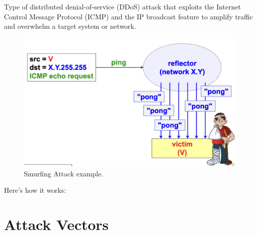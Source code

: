 \begin{multicols}{2}
    Type of distributed denial-of-service (DDoS) attack that exploits the Internet Control Message Protocol (ICMP) and the IP broadcast feature to amplify traffic and overwhelm a target system or network. 

\columnbreak

    \begin{figure}[H]
        \centering
        \includegraphics[width=0.5\linewidth]{Images/NetSec/smurfing.png}
        \caption{Smurfing Attack example.}
    \end{figure}
\end{multicols}

Here’s how it works:


















\section{Attack Vectors}

